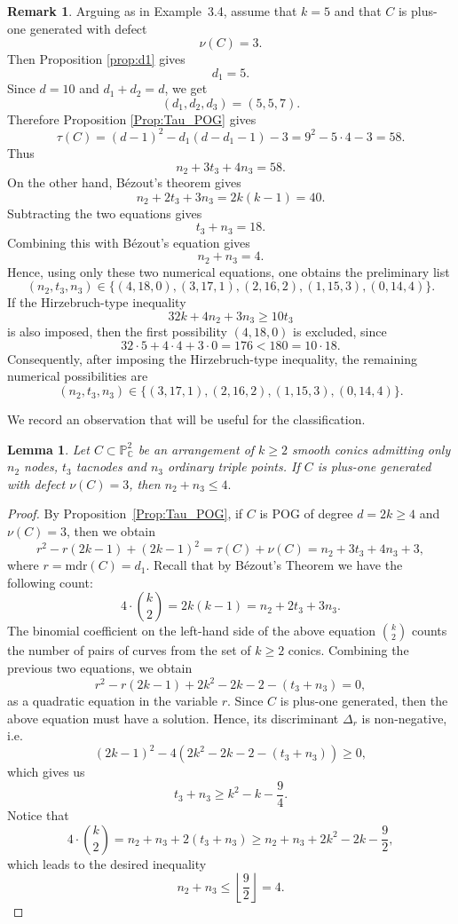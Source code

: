 \documentclass[11pt]{article}
\theoremstyle{plain}
\newtheorem{lemma}[thm]{Lemma}
\theoremstyle{definition}
\newtheorem{remark}[thm]{Remark}
\begin{document}
\begin{remark} \label{rem:5k}
Arguing as in Example~3.4, assume that \(k=5\) and that \(C\) is plus-one generated with defect
\[
\nu(C)=3.
\]
Then Proposition \ref{prop:d1} gives
\[
d_1=5.
\]
Since \(d=10\) and \(d_1+d_2=d\), we get
\[
(d_1,d_2,d_3)=(5,5,7).
\]
Therefore Proposition \ref{Prop:Tau_POG} gives
\[
\tau(C)
=
(d-1)^2-d_1(d-d_1-1)-3
=
9^2-5\cdot 4-3
=
58.
\]
Thus
\[
n_2+3t_3+4n_3=58.
\]
On the other hand, B\'ezout's theorem gives
\[
n_2+2t_3+3n_3
=
2k(k-1)
=
40.
\]
Subtracting the two equations gives
\[
t_3+n_3=18.
\]
Combining this with B\'ezout's equation gives
\[
n_2+n_3=4.
\]
Hence, using only these two numerical equations, one obtains the preliminary list
\[
(n_2,t_3,n_3)\in
\{(4,18,0),(3,17,1),(2,16,2),(1,15,3),(0,14,4)\}.
\]
If the Hirzebruch-type inequality
\[
32k+4n_2+3n_3\geq 10t_3
\]
is also imposed, then the first possibility \((4,18,0)\) is excluded, since
\[
32\cdot 5+4\cdot 4+3\cdot 0
=
176
<
180
=
10\cdot 18.
\]
Consequently, after imposing the Hirzebruch-type inequality, the remaining numerical possibilities are
\[
(n_2,t_3,n_3)\in
\{(3,17,1),(2,16,2),(1,15,3),(0,14,4)\}.
\]
\end{remark}

We record an observation that will be useful for the classification. 




\begin{lemma} \label{n2n3}
    Let $C\subset \mathbb{P}^2_{\mathbb{C}}$ be an arrangement of $k\geq 2$ smooth conics admitting only $n_2$ nodes, $t_3$ tacnodes and $n_3$ ordinary triple points. If $C$ is plus-one generated with defect $\nu (C)=3$, then $n_2+n_3\leq4.$
\end{lemma}

\begin{proof}
    By Proposition~\ref{Prop:Tau_POG}, if $C$ is POG of degree $d=2k\geq4$ and $\nu(C)=3$, then we obtain
    $$r^2-r(2k-1)+(2k-1)^2=\tau(C)+\nu(C)=n_2+3t_3+4n_3+3,$$
    where $r=\text{mdr}(C)=d_1.$ Recall that by B\'ezout's Theorem we have the following count:
    \begin{equation}
        4\cdot \binom{k}{2}=2k(k-1)=n_2+2t_3+3n_3.
        \label{Bezout}
    \end{equation}
    The binomial coefficient on the left-hand side of the above equation $\binom{k}{2}$ counts the number of pairs of curves from the set of $k\geq2$ conics. Combining the previous two equations, we obtain
    $$r^2-r(2k-1)+2k^2-2k-2-(t_3+n_3)=0,$$
    as a quadratic equation in the variable $r$. Since $C$ is plus-one generated, then the above equation must have a solution. Hence, its discriminant $\Delta_r$ is non-negative, i.e.
    $$(2k-1)^2-4\left(2k^2-2k-2-(t_3+n_3)\right)\geq0,$$
    which gives us
    $$t_3+n_3\geq k^2-k-\frac{9}{4}.$$
    Notice that
    $$4\cdot \binom{k}{2}=n_2+n_3+2(t_3+n_3)\geq n_2+n_3+2k^2-2k-\frac{9}{2},$$
    which leads to the desired inequality
    $$n_2+n_3\leq \left\lfloor\frac{9}{2}\right\rfloor=4.$$
\end{proof}
\end{document}
